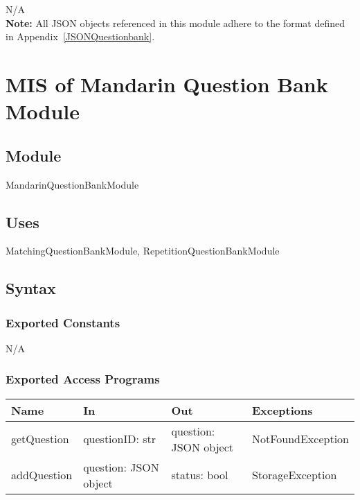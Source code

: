 \documentclass[12pt, titlepage]{article}
\begin{document}
N/A\\
\noindent \textbf{Note:} All JSON objects referenced in this module adhere to the format defined in Appendix~\ref{JSONQuestionbank}.

\section{MIS of Mandarin Question Bank Module} \label{MandarinQuestionBankModule}

\subsection{Module}

MandarinQuestionBankModule

\subsection{Uses}

MatchingQuestionBankModule, RepetitionQuestionBankModule

\subsection{Syntax}

\subsubsection{Exported Constants}

N/A

\subsubsection{Exported Access Programs}

\begin{center}
\begin{tabular}{p{3cm} p{4cm} p{4cm} p{5cm}}
\hline
\textbf{Name} & \textbf{In} & \textbf{Out} & \textbf{Exceptions} \\
\hline
getQuestion & \raggedright\arraybackslash questionID: str & \raggedright\arraybackslash question: JSON object & \raggedright\arraybackslash NotFoundException \\
\hline
addQuestion & \raggedright\arraybackslash question: JSON object & \raggedright\arraybackslash status: bool & \raggedright\arraybackslash StorageException \\
\hline
\end{tabular}
\end{center}
\end{document}
